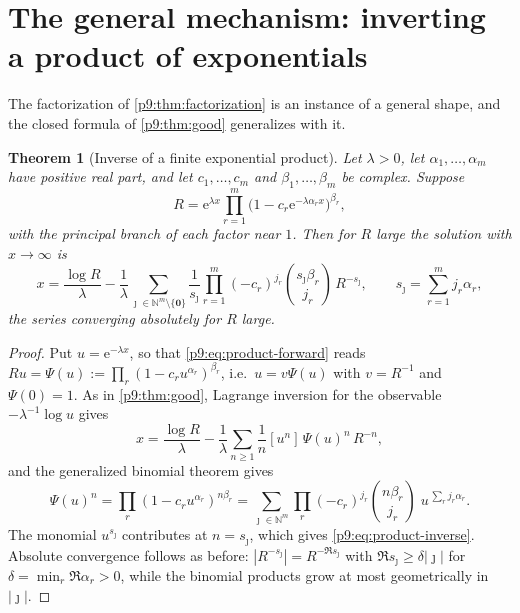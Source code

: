 \documentclass[11pt,a4paper,oneside]{book}
\theoremstyle{plain}
\newtheorem{theorem}{Theorem}[chapter]
\theoremstyle{definition}
\theoremstyle{remark}
\newcommand{\Nat}{\mathbb{N}}
\newcommand{\e}{\mathrm{e}}
\newcommand{\Coef}[1]{[#1]\,}
\begin{document}
\section{The general mechanism: inverting a product of exponentials}
\label{p9:sec:general}

The factorization of \cref{p9:thm:factorization} is an instance of a general
shape, and the closed formula of \cref{p9:thm:good} generalizes with it.

\begin{theorem}[Inverse of a finite exponential product]\label{p9:thm:product}
Let $\lambda>0$, let $\alpha_1,\dots,\alpha_m$ have positive real part, and
let $c_1,\dots,c_m$ and $\beta_1,\dots,\beta_m$ be complex.  Suppose
\begin{equation}\label{p9:eq:product-forward}
 R=\e^{\lambda x}\prod_{r=1}^{m}
 \bigl(1-c_r\e^{-\lambda\alpha_r x}\bigr)^{\beta_r},
\end{equation}
with the principal branch of each factor near $1$.  Then for $R$ large the
solution with $x\to\infty$ is
\begin{equation}\label{p9:eq:product-inverse}
 x=\frac{\log R}\lambda
 -\frac1\lambda\sum_{\bm\jmath\in\Nat^{m}\setminus\{\bm0\}}
 \frac1{s_{\bm\jmath}}
 \prod_{r=1}^{m}(-c_r)^{j_r}\binom{s_{\bm\jmath}\beta_r}{j_r}\,
 R^{-s_{\bm\jmath}},
 \qquad
 s_{\bm\jmath}=\sum_{r=1}^{m}j_r\alpha_r,
\end{equation}
the series converging absolutely for $R$ large.
\end{theorem}

\begin{proof}
Put $u=\e^{-\lambda x}$, so that \eqref{p9:eq:product-forward} reads
$Ru=\Psi(u):=\prod_r(1-c_ru^{\alpha_r})^{\beta_r}$, i.e.\ $u=v\Psi(u)$ with
$v=R^{-1}$ and $\Psi(0)=1$.  As in \cref{p9:thm:good}, Lagrange inversion for
the observable $-\lambda^{-1}\log u$ gives
\[
 x=\frac{\log R}\lambda-\frac1\lambda\sum_{n\ge1}\frac1n
 \Coef{u^{n}}\Psi(u)^{n}\,R^{-n},
\]
and the generalized binomial theorem gives
\[
 \Psi(u)^{n}=\prod_{r}(1-c_ru^{\alpha_r})^{n\beta_r}
 =\sum_{\bm\jmath\in\Nat^{m}}
 \prod_{r}(-c_r)^{j_r}\binom{n\beta_r}{j_r}\;
 u^{\,\sum_rj_r\alpha_r}.
\]
The monomial $u^{s_{\bm\jmath}}$ contributes at $n=s_{\bm\jmath}$, which gives
\eqref{p9:eq:product-inverse}.  Absolute convergence follows as before:
$|R^{-s_{\bm\jmath}}|=R^{-\Re s_{\bm\jmath}}$ with
$\Re s_{\bm\jmath}\ge\delta|\bm\jmath|$ for
$\delta=\min_r\Re\alpha_r>0$, while the binomial products grow at most
geometrically in $|\bm\jmath|$.
\end{proof}
\end{document}
